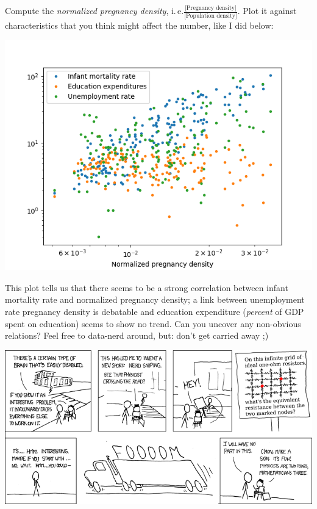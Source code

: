 \documentclass[
	english,
	fontsize=10pt,
	parskip=half,
	titlepage=true,
	DIV=12
]{scrartcl}
\newcommand*{\ie}{i.\,e.\xspace}
\begin{document}
Compute the \emph{normalized pregnancy density}, \ie $\frac{\text{[Pregnancy density]}}{\text{[Population density]}}$. Plot it against characteristics that you think might affect the number, like I did below:
\begin{center}
	\includegraphics[width=.7\linewidth]{./DataAnalysis}
\end{center}
This plot tells us that there seems to be a strong correlation between infant mortality rate and normalized pregnancy density; a link between unemployment rate pregnancy density is debatable and education expenditure (\emph{percent} of GDP spent on education) seems to show no trend. Can you uncover any non-obvious relations? Feel free to data-nerd around, but: don't get carried away ;)

\begin{center}
	\includegraphics[width=.9\linewidth]{./xkcd-nerdSniping}
\end{center}
\end{document}
